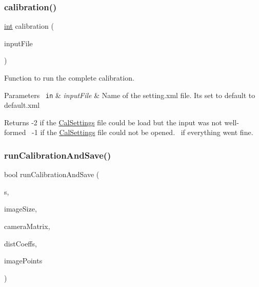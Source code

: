 \subsubsection{\texorpdfstring{calibration()}{calibration()}}
{\footnotesize\ttfamily \mbox{\hyperlink{draw_8hh_aa620a13339ac3a1177c86edc549fda9b}{int}} calibration (\begin{DoxyParamCaption}\item[{string}]{input\+File }\end{DoxyParamCaption})}



Function to run the complete calibration. 


\begin{DoxyParams}[1]{Parameters}
\mbox{\texttt{ in}}  & {\em input\+File} & Name of the setting.\+xml file. It\textquotesingle{}s set to default to default.\+xml\\
\hline
\end{DoxyParams}
\begin{DoxyReturn}{Returns}
-\/2 if the \mbox{\hyperlink{class_cal_settings}{Cal\+Settings}} file could be load but the input was not well-\/formed~\newline
 -\/1 if the \mbox{\hyperlink{class_cal_settings}{Cal\+Settings}} file could not be opened.~ if everything went fine. 
\end{DoxyReturn}
\mbox{\label{calibration_8hh_a4195037da024926ac4f645bd09700052}} 
\subsubsection{\texorpdfstring{runCalibrationAndSave()}{runCalibrationAndSave()}}
{\footnotesize\ttfamily bool run\+Calibration\+And\+Save (\begin{DoxyParamCaption}\item[{\mbox{\hyperlink{class_cal_settings}{Cal\+Settings}} \&}]{s,  }\item[{Size}]{image\+Size,  }\item[{Mat \&}]{camera\+Matrix,  }\item[{Mat \&}]{dist\+Coeffs,  }\item[{vector$<$ vector$<$ Point2f $>$ $>$}]{image\+Points }\end{DoxyParamCaption})}



